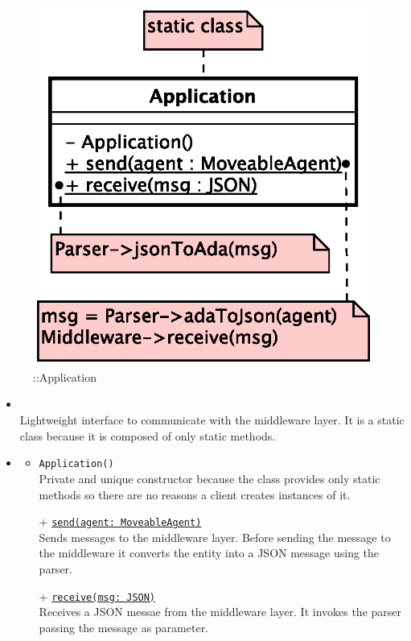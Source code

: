 \begin{figure}[h]
\centering
\includegraphics[scale=0.6,keepaspectratio]{images/solution/app/backend/application.eps}
\caption{\pInterface::Application}
\label{fig:sd-app-application}
\end{figure}
\FloatBarrier
\begin{itemize}
  \item \textbf{\descr} \\
    Lightweight interface to communicate with the middleware layer.
    It is a static class because it is composed of only static methods.
  \item \textbf{\ops}
  \begin{itemize}
   \item \texttt{Application()} \\
   Private and unique constructor because the class provides only static methods 
    so there are no reasons a client creates instances of it.
    \item[+] \texttt{\underline{send(agent: MoveableAgent)}} \\
    Sends messages to the middleware layer. Before sending the message to the
    middleware it converts the entity into a JSON message using the parser.
    \item[+] \texttt{\underline{receive(msg: JSON)}} \\
    Receives a JSON messae from the middleware layer. It invokes the parser 
    passing the message as parameter.
  \end{itemize}
\end{itemize}
